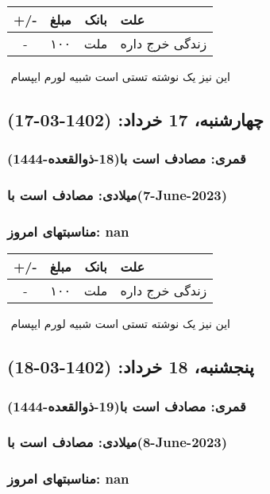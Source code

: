 \documentclass{article}
\newcommand{\rnote}[1]{\marginpar{\textcolor{color}{\StrSubstitute{\##1}{ }{\_}}}}
\newcommand{\myRow}[4]{
    #1 & #2 & #3 & #4 \\ \hline
}
\begin{document}
\begin{tabular}{ | c | c | c | p{5cm} |}
    \hline
    \myRow{ +/- }{مبلغ}{بانک}{علت}
    \myRow{-}{۱۰۰}{ملت}{زندگی خرج داره}
\end{tabular}
\newline
\newline

‌
\rnote{تست}
این نیز یک نوشته تستی است شبیه لورم ایپسام




\newpage
{}
\textcolor{color}{
\section{ چهارشنبه، 17 خرداد: (1402-03-17) }
\subsubsection*{قمری: مصادف است با(18-ذوالقعده-1444)} 
\subsubsection*{میلادی: مصادف است با(7-June-2023)}
\subsubsection*{مناسبتهای امروز: nan}
}


\begin{tabular}{ | c | c | c | p{5cm} |}
    \hline
    \myRow{ +/- }{مبلغ}{بانک}{علت}
    \myRow{-}{۱۰۰}{ملت}{زندگی خرج داره}
\end{tabular}
\newline
\newline

‌
\rnote{تست}
این نیز یک نوشته تستی است شبیه لورم ایپسام




\newpage
{}
\textcolor{color}{
\section{ پنجشنبه، 18 خرداد: (1402-03-18) }
\subsubsection*{قمری: مصادف است با(19-ذوالقعده-1444)} 
\subsubsection*{میلادی: مصادف است با(8-June-2023)}
\subsubsection*{مناسبتهای امروز: nan}
}
\end{document}
